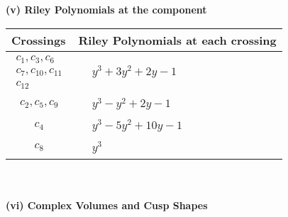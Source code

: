 \documentclass[1p]{elsarticle_modified}
\theoremstyle{definition}
\begin{document}
\newpage\renewcommand{\arraystretch}{1}
\flushleft \textbf{(v) Riley Polynomials at the component}\newline \\
\begin{tabular}{m{50pt}|m{274pt}}
Crossings & \hspace{64pt}Riley Polynomials at each crossing \\
\hline $$\begin{aligned}c_{1},c_{3},c_{6}\\c_{7},c_{10},c_{11}\\c_{12}\end{aligned}$$&$\begin{aligned}
&y^3+3 y^2+2 y-1
\end{aligned}$\\
\hline $$\begin{aligned}c_{2},c_{5},c_{9}\end{aligned}$$&$\begin{aligned}
&y^3- y^2+2 y-1
\end{aligned}$\\
\hline $$\begin{aligned}c_{4}\end{aligned}$$&$\begin{aligned}
&y^3-5 y^2+10 y-1
\end{aligned}$\\
\hline $$\begin{aligned}c_{8}\end{aligned}$$&$\begin{aligned}
&y^3
\end{aligned}$\\
\hline
\end{tabular}\\~\\
\newpage\flushleft \textbf{(vi) Complex Volumes and Cusp Shapes}
\end{document}

